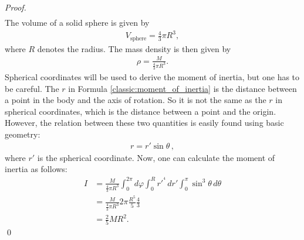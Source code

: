 \begin{example}
\begin{mdframed}[roundcorner=10pt, linecolor=blue, linewidth=1pt]
\begin{proof}[Proof]
\begin{align}
                \end{align}
                The volume of a solid sphere is given by
                \begin{gather}
                    V_\text{sphere} = \frac{4}{3}\pi R^3,
                \end{gather}
                where $R$ denotes the radius. The mass density is then given by
                \begin{gather}
                    \rho = \frac{M}{\frac{4}{3}\pi R^3}.
                \end{gather}
                Spherical coordinates will be used to derive the moment of inertia, but one has to be careful. The $r$ in Formula \ref{classic:moment_of_inertia} is the distance between a point in the body and the axis of rotation. So it is not the same as the $r$ in spherical coordinates, which is the distance between a point and the origin. However, the relation between these two quantities is easily found using basic geometry:
                \begin{gather}
                    r=r'\sin\theta\,,
                \end{gather}
                where $r'$ is the spherical coordinate. Now, one can calculate the moment of inertia as follows:
                \begin{align}
                    I &= \frac{M}{\frac{4}{3}\pi R^3} \int_0^{2\pi}d\varphi\int_0^Rr'^{^4}\,dr'\int_0^\pi\sin^3\theta\,d\theta\nonumber\\
                    &= \frac{M}{\frac{4}{3}\pi R^3} 2\pi\frac{R^5}{5}\frac{4}{3}\nonumber\\
                    &= \frac{2}{5}MR^2.
                \end{align}\qed
            \end{proof}
        \end{mdframed}
    \end{example}


